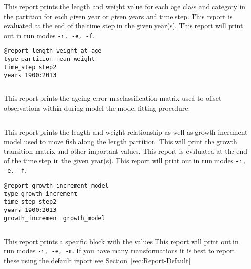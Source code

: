 This report prints the length and weight value for each age class and category in the partition for each given year or given years and time step. This report is evaluated at the end of the time step in the given year(s). This report will print out in run modes \texttt{-r, -e, -f}.

\begin{verbatim}
@report length_weight_at_age
type partition_mean_weight
time_step step2
years 1900:2013
\end{verbatim}

\subsection{}\label{sec:Report-AgeingErrorMatrix}

This report prints the ageing error misclassification matrix used to offset observations within during model the model fitting procedure.


\else

\subsection{}\label{sec:Report-GrowthIncrement}

This report prints the length and weight relationship as well as growth increment model used to move fish along the length partition. This will print the growth transition matrix and other important values. This report is evaluated at the end of the time step in the given year(s). This report will print out in run modes \texttt{-r, -e, -f}.

\begin{verbatim}
@report growth_increment_model
type growth_increment
time_step step2
years 1900:2013
growth_increment growth_model
\end{verbatim}

\fi %

\subsection{}\label{sec:Report-ParameterTransformations}

This report prints a specific  block with the values This report will print out in run modes \texttt{-r, -e, -m}. If you have many transformations it is best to report these using the default report see Section~\ref{sec:Report-Default}

